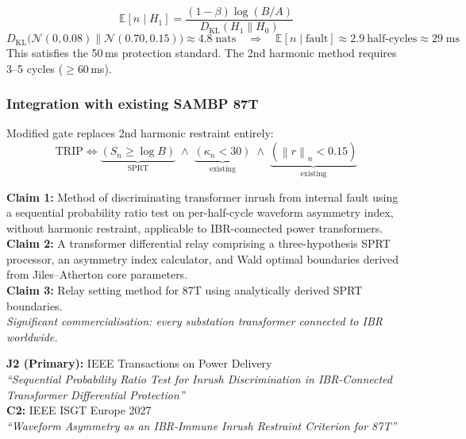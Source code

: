 \documentclass[12pt, a4paper]{report}
\newcommand{\norm}[1]{\left\lVert#1\right\rVert}
\begin{document}
\begin{tcolorbox}[mathbox]
\begin{equation}
  \mathbb{E}[n \mid H_1] = \frac{(1-\beta)\log(B/A)}{D_\mathrm{KL}(H_1 \| H_0)}
\end{equation}
\begin{equation}
  D_\mathrm{KL}\!\bigl(\mathcal{N}(0,0.08) \| \mathcal{N}(0.70,0.15)\bigr) \approx 4.8\;\text{nats}
  \quad\Rightarrow\quad \mathbb{E}[n \mid \text{fault}] \approx 2.9\ \text{half-cycles} \approx 29\;\text{ms}
\end{equation}
This satisfies the 50\,ms protection standard. The 2nd harmonic method requires 3--5 cycles ($\ge$60\,ms).
\end{tcolorbox}

\subsubsection{Integration with existing SAMBP 87T}

Modified gate replaces 2nd harmonic restraint entirely:
\begin{equation}
  \mathrm{TRIP} \iff \underbrace{(S_n \ge \log B)}_{\text{SPRT}} \;\wedge\; \underbrace{(\kappa_n < 30)}_{\text{existing}} \;\wedge\; \underbrace{(\norm{r}_n < 0.15)}_{\text{existing}}
\end{equation}

\begin{tcolorbox}[ipbox, title={IP — Patent Family P2}]
\textbf{Claim 1:} Method of discriminating transformer inrush from internal fault using a sequential probability ratio test on per-half-cycle waveform asymmetry index, without harmonic restraint, applicable to IBR-connected power transformers.\\[4pt]
\textbf{Claim 2:} A transformer differential relay comprising a three-hypothesis SPRT processor, an asymmetry index calculator, and Wald optimal boundaries derived from Jiles--Atherton core parameters.\\[4pt]
\textbf{Claim 3:} Relay setting method for 87T using analytically derived SPRT boundaries.\\[4pt]
\textit{Significant commercialisation: every substation transformer connected to IBR worldwide.}
\end{tcolorbox}

\begin{tcolorbox}[pubbox, title={Publications — TR-57}]
\textbf{J2 (Primary):} IEEE Transactions on Power Delivery\\
\textit{``Sequential Probability Ratio Test for Inrush Discrimination in IBR-Connected Transformer Differential Protection''}\\[4pt]
\textbf{C2:} IEEE ISGT Europe 2027\\
\textit{``Waveform Asymmetry as an IBR-Immune Inrush Restraint Criterion for 87T''}
\end{tcolorbox}
\end{document}

